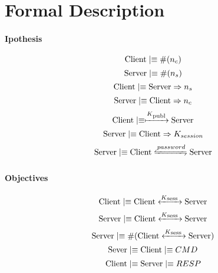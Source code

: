 \newcommand{\believes}{\mid\equiv}
\newcommand{\sees}{\triangleleft}
\newcommand{\oncesaid}{\mid\sim}
\newcommand{\controls}{\Rightarrow}
\newcommand{\fresh}[1]{\#(#1)}
\newcommand{\combine}[2]{{\langle #1 \rangle}_{#2}}
\newcommand{\encrypt}[2]{{ \{ #1 \} }_{#2}}
\newcommand{\sharekey}[1]{\xleftrightarrow{#1}}
\newcommand{\pubkey}[1]{\xmapsto{#1}}
\newcommand{\secret}[1]{\xleftrightharpoons{#1}}


\section{Formal Description}
\paragraph{Ipothesis}
\[\textnormal{Client} \believes \fresh{n_c}\]
\[\textnormal{Server} \believes \fresh{n_s}\]
\[\textnormal{Client} \believes \textnormal{Server} \controls n_s\]
\[\textnormal{Server} \believes \textnormal{Client} \controls n_c\]
\[\textnormal{Client} \believes \pubkey{K\textsubscript{publ}} \textnormal{Server}\]
\[\textnormal{Server} \believes \textnormal{Client} \controls K_{session}\]
\[\textnormal{Server} \believes \textnormal{Client} \secret{password} \textnormal{Server}\]

\paragraph{Objectives}
\[\textnormal{Client} \believes \textnormal{Client} \sharekey{K\textsubscript{sess }} \textnormal{Server}\]
\[\textnormal{Server} \believes \textnormal{Client} \sharekey{K\textsubscript{sess }} \textnormal{Server}\]
\[\textnormal{Server} \believes \fresh{\textnormal{Client} \sharekey{K\textsubscript{sess }} \textnormal{Server}}\]
\[\textnormal{Sever} \believes \textnormal{Client}\believes CMD\]
\[\textnormal{Client} \believes \textnormal{Server}\believes RESP\]

